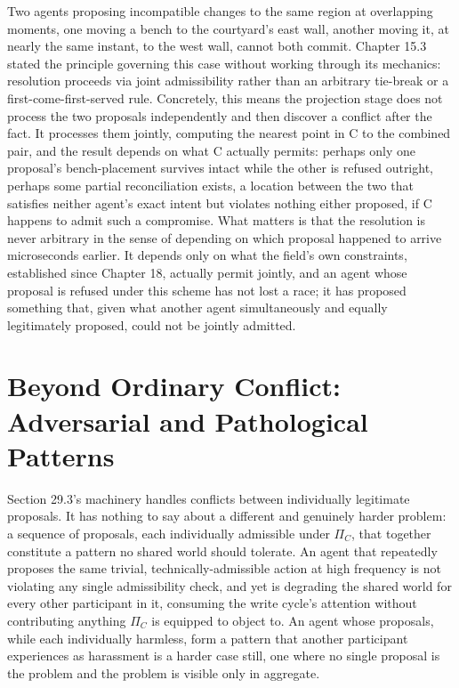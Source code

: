 Two agents proposing incompatible changes to the same region at overlapping moments, one moving a bench to the courtyard's east wall, another moving it, at nearly the same instant, to the west wall, cannot both commit. Chapter 15.3 stated the principle governing this case without working through its mechanics: resolution proceeds via joint admissibility rather than an arbitrary tie-break or a first-come-first-served rule. Concretely, this means the projection stage does not process the two proposals independently and then discover a conflict after the fact. It processes them jointly, computing the nearest point in C to the combined pair, and the result depends on what C actually permits: perhaps only one proposal's bench-placement survives intact while the other is refused outright, perhaps some partial reconciliation exists, a location between the two that satisfies neither agent's exact intent but violates nothing either proposed, if C happens to admit such a compromise. What matters is that the resolution is never arbitrary in the sense of depending on which proposal happened to arrive microseconds earlier. It depends only on what the field's own constraints, established since Chapter 18, actually permit jointly, and an agent whose proposal is refused under this scheme has not lost a race; it has proposed something that, given what another agent simultaneously and equally legitimately proposed, could not be jointly admitted.

\section{Beyond Ordinary Conflict: Adversarial and Pathological Patterns}

Section 29.3's machinery handles conflicts between individually legitimate proposals. It has nothing to say about a different and genuinely harder problem: a sequence of proposals, each individually admissible under \(\Pi_C\), that together constitute a pattern no shared world should tolerate. An agent that repeatedly proposes the same trivial, technically-admissible action at high frequency is not violating any single admissibility check, and yet is degrading the shared world for every other participant in it, consuming the write cycle's attention without contributing anything \(\Pi_C\) is equipped to object to. An agent whose proposals, while each individually harmless, form a pattern that another participant experiences as harassment is a harder case still, one where no single proposal is the problem and the problem is visible only in aggregate.

